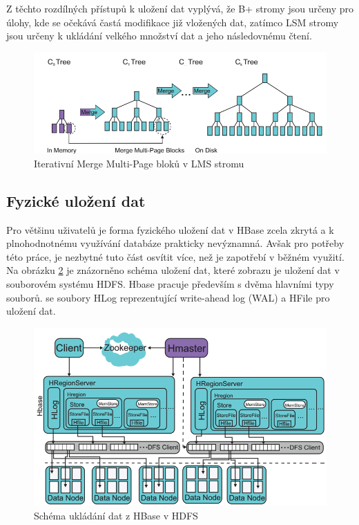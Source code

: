 \documentclass[thesis=M,czech]{FITthesis}[2012/06/26]
\begin{document}
Z těchto rozdílných přístupů k uložení dat vyplývá, že B+ stromy jsou určeny pro úlohy, kde se očekává častá modifikace již vložených dat, zatímco LSM stromy jsou určeny k ukládání velkého množství dat a jeho následovnému čtení.


\begin{figure}\centering
	\includegraphics[width=1\textwidth, angle=0]{files/lms}
	\caption[Iterativní Merge Multi-Page bloků v LMS stromu ]{Iterativní Merge Multi-Page bloků v LMS stromu }\label{fig:lms}
\end{figure}

\subsection{Fyzické uložení dat}	
Pro většinu uživatelů je forma fyzického uložení dat v HBase zcela zkrytá a k plnohodnotnému využívání databáze prakticky nevýznamná. Avšak pro potřeby této práce, je nezbytné tuto část osvítit více, než je zapotřebí v běžném využití. Na obrázku \ref{fig:hbasehdfs} je znázorněno schéma uložení dat, které zobrazu
je uložení dat v souborovém systému HDFS. Hbase pracuje především s dvěma hlavními typy souborů. se soubory HLog reprezentující write-ahead log (WAL) a HFile pro uložení dat.\cite{hbasecon}

\begin{figure}\centering
	\includegraphics[width=1\textwidth, angle=0]{files/HBaseHDFS}
	\caption[Schéma ukládání dat z HBase v HDFS]{Schéma ukládání dat z HBase v HDFS}\label{fig:hbasehdfs}
\end{figure}
\end{document}
